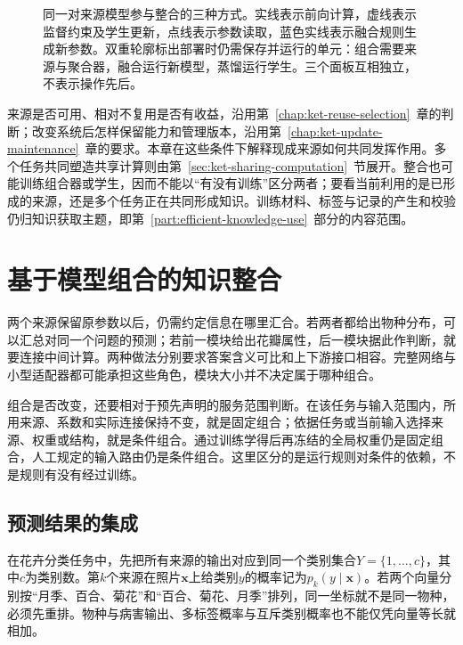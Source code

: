 \begin{figure}[htbp]
  \centering
  
  \caption{同一对来源模型参与整合的三种方式。实线表示前向计算，虚线表示监督约束及学生更新，点线表示参数读取，蓝色实线表示融合规则生成新参数。双重轮廓标出部署时仍需保存并运行的单元：组合需要来源与聚合器，融合运行新模型，蒸馏运行学生。三个面板互相独立，不表示操作先后。}
  \label{fig:ket-integration-routes}
\end{figure}

来源是否可用、相对不复用是否有收益，沿用第~\ref{chap:ket-reuse-selection}~章的判断；改变系统后怎样保留能力和管理版本，沿用第~\ref{chap:ket-update-maintenance}~章的要求。本章在这些条件下解释现成来源如何共同发挥作用。多个任务共同塑造共享计算则由第~\ref{sec:ket-sharing-computation}~节展开。整合也可能训练组合器或学生，因而不能以“有没有训练”区分两者；要看当前利用的是已形成的来源，还是多个任务正在共同形成知识。训练材料、标签与记录的产生和校验仍归知识获取主题，即第~\ref{part:efficient-knowledge-use}~部分的内容范围。

\section{基于模型组合的知识整合}
\label{sec:ket-integration-composition}

两个来源保留原参数以后，仍需约定信息在哪里汇合。若两者都给出物种分布，可以汇总对同一个问题的预测；若前一模块给出花瓣属性，后一模块据此作判断，就要连接中间计算。两种做法分别要求答案含义可比和上下游接口相容。完整网络与小型适配器都可能承担这些角色，模块大小并不决定属于哪种组合。

组合是否改变，还要相对于预先声明的服务范围判断。在该任务与输入范围内，所用来源、系数和实际连接保持不变，就是固定组合；依据任务或当前输入选择来源、权重或结构，就是条件组合。通过训练学得后再冻结的全局权重仍是固定组合，人工规定的输入路由仍是条件组合。这里区分的是运行规则对条件的依赖，不是规则有没有经过训练。

\subsection{预测结果的集成}
\label{sec:ket-integration-prediction}

在花卉分类任务中，先把所有来源的输出对应到同一个类别集合$Y=\{1,\ldots,c\}$，其中$c$为类别数。第$k$个来源在照片$\bm{x}$上给类别$y$的概率记为$p_k(y\mid\bm{x})$。若两个向量分别按“月季、百合、菊花”和“百合、菊花、月季”排列，同一坐标就不是同一物种，必须先重排。物种与病害输出、多标签概率与互斥类别概率也不能仅凭向量等长就相加。

